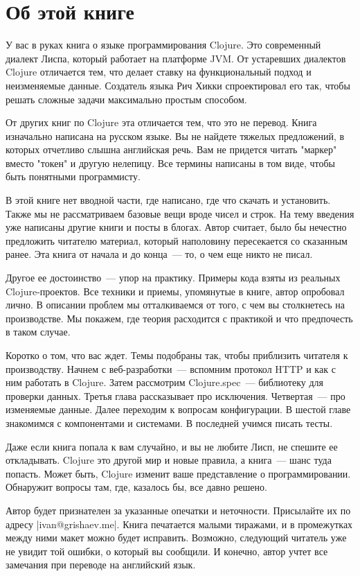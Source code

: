 \chapter*{Об этой книге}

У вас в руках книга о языке программирования Clojure. Это современный диалект
Лиспа, который работает на платформе JVM. От устаревших диалектов Clojure
отличается тем, что делает ставку на функциональный подход и неизменяемые
данные. Создатель языка Рич Хикки спроектировал его так, чтобы решать сложные
задачи максимально простым способом.

От других книг по Clojure эта отличается тем, что это не перевод. Книга
изначально написана на русском языке. Вы не найдете тяжелых предложений, в
которых отчетливо слышна английская речь. Вам не придется читать "маркер" вместо
"токен" и другую нелепицу. Все термины написаны в том виде, чтобы быть понятными
программисту.

В этой книге нет вводной части, где написано, где что скачать и
установить. Также мы не рассматриваем базовые вещи вроде чисел и строк. На тему
введения уже написаны другие книги и посты в блогах. Автор считает, было бы
нечестно предложить читателю материал, который наполовину пересекается со
сказанным ранее. Эта книга от начала и до конца~--- то, о чем еще никто не писал.

Другое ее достоинство~--- упор на практику. Примеры кода взяты из реальных
Clojure-проектов. Все техники и приемы, упомянутые в книге, автор опробовал
лично. В описании проблем мы отталкиваемся от того, с чем вы столкнетесь на
производстве. Мы покажем, где теория расходится с практикой и что предпочесть в
таком случае.

Коротко о том, что вас ждет. Темы подобраны так, чтобы приблизить читателя к
производству. Начнем с веб-разработки~--- вспомним протокол HTTP и как с ним
работать в Clojure. Затем рассмотрим Clojure.spec~--- библиотеку для проверки
данных. Третья глава рассказывает про исключения. Четвертая~--- про изменяемые
данные. Далее переходим к вопросам конфигурации. В шестой главе знакомимся с
компонентами и системами. В последней учимся писать тесты.

Даже если книга попала к вам случайно, и вы не любите Лисп, не спешите ее
откладывать. Clojure это другой мир и новые правила, а книга~--- шанс туда
попасть. Может быть, Clojure изменит ваше представление о
программировании. Обнаружит вопросы там, где, казалось бы, все давно решено.

Автор будет признателен за указанные опечатки и неточности. Присылайте их по
адресу \spverb|ivan@grishaev.me|. Книга печатается малыми тиражами, и в
промежутках между ними макет можно будет исправить. Возможно, следующий читатель
уже не увидит той ошибки, о который вы сообщили. И конечно, автор учтет все
замечания при переводе на английский язык.

